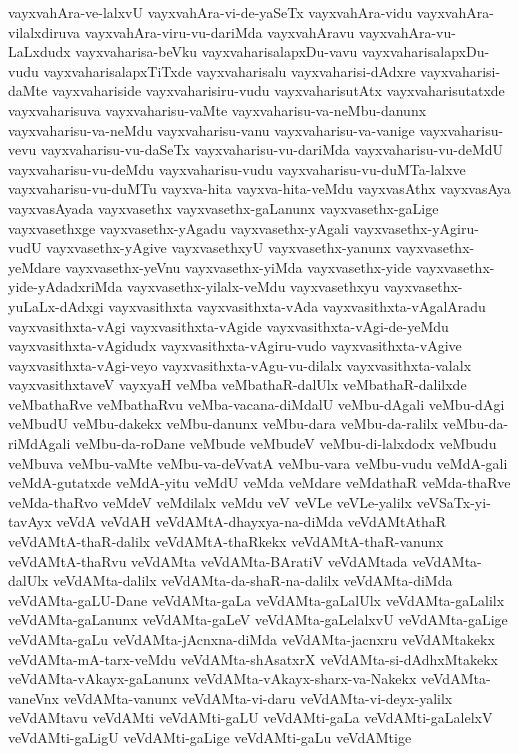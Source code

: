 {vayxvahAra-ve-lalxvU
vayxvahAra-vi-de-yaSeTx
vayxvahAra-vidu
vayxvahAra-vilalxdiruva
vayxvahAra-viru-vu-dariMda
vayxvahAravu
vayxvahAra-vu-LaLxdudx
vayxvaharisa-beVku
vayxvaharisalapxDu-vavu
vayxvaharisalapxDu-vudu
vayxvaharisalapxTiTxde
vayxvaharisalu
vayxvaharisi-dAdxre
vayxvaharisi-daMte
vayxvahariside
vayxvaharisiru-vudu
vayxvaharisutAtx
vayxvaharisutatxde
vayxvaharisuva
vayxvaharisu-vaMte
vayxvaharisu-va-neMbu-danunx
vayxvaharisu-va-neMdu
vayxvaharisu-vanu
vayxvaharisu-va-vanige
vayxvaharisu-vevu
vayxvaharisu-vu-daSeTx
vayxvaharisu-vu-dariMda
vayxvaharisu-vu-deMdU
vayxvaharisu-vu-deMdu
vayxvaharisu-vudu
vayxvaharisu-vu-duMTa-lalxve
vayxvaharisu-vu-duMTu
vayxva-hita
vayxva-hita-veMdu
vayxvasAthx
vayxvasAya
vayxvasAyada
vayxvasethx
vayxvasethx-gaLanunx
vayxvasethx-gaLige
vayxvasethxge
vayxvasethx-yAgadu
vayxvasethx-yAgali
vayxvasethx-yAgiru-vudU
vayxvasethx-yAgive
vayxvasethxyU
vayxvasethx-yanunx
vayxvasethx-yeMdare
vayxvasethx-yeVnu
vayxvasethx-yiMda
vayxvasethx-yide
vayxvasethx-yide-yAdadxriMda
vayxvasethx-yilalx-veMdu
vayxvasethxyu
vayxvasethx-yuLaLx-dAdxgi
vayxvasithxta
vayxvasithxta-vAda
vayxvasithxta-vAgalAradu
vayxvasithxta-vAgi
vayxvasithxta-vAgide
vayxvasithxta-vAgi-de-yeMdu
vayxvasithxta-vAgidudx
vayxvasithxta-vAgiru-vudo
vayxvasithxta-vAgive
vayxvasithxta-vAgi-veyo
vayxvasithxta-vAgu-vu-dilalx
vayxvasithxta-valalx
vayxvasithxtaveV
vayxyaH
veMba
veMbathaR-dalUlx
veMbathaR-dalilxde
veMbathaRve
veMbathaRvu
veMba-vacana-diMdalU
veMbu-dAgali
veMbu-dAgi
veMbudU
veMbu-dakekx
veMbu-danunx
veMbu-dara
veMbu-da-ralilx
veMbu-da-riMdAgali
veMbu-da-roDane
veMbude
veMbudeV
veMbu-di-lalxdodx
veMbudu
veMbuva
veMbu-vaMte
veMbu-va-deVvatA
veMbu-vara
veMbu-vudu
veMdA-gali
veMdA-gutatxde
veMdA-yitu
veMdU
veMda
veMdare
veMdathaR
veMda-thaRve
veMda-thaRvo
veMdeV
veMdilalx
veMdu
veV
veVLe
veVLe-yalilx
veVSaTx-yi-tavAyx
veVdA
veVdAH
veVdAMtA-dhayxya-na-diMda
veVdAMtAthaR
veVdAMtA-thaR-dalilx
veVdAMtA-thaRkekx
veVdAMtA-thaR-vanunx
veVdAMtA-thaRvu
veVdAMta
veVdAMta-BAratiV
veVdAMtada
veVdAMta-dalUlx
veVdAMta-dalilx
veVdAMta-da-shaR-na-dalilx
veVdAMta-diMda
veVdAMta-gaLU-Dane
veVdAMta-gaLa
veVdAMta-gaLalUlx
veVdAMta-gaLalilx
veVdAMta-gaLanunx
veVdAMta-gaLeV
veVdAMta-gaLelalxvU
veVdAMta-gaLige
veVdAMta-gaLu
veVdAMta-jAcnxna-diMda
veVdAMta-jacnxru
veVdAMtakekx
veVdAMta-mA-tarx-veMdu
veVdAMta-shAsatxrX
veVdAMta-si-dAdhxMtakekx
veVdAMta-vAkayx-gaLanunx
veVdAMta-vAkayx-sharx-va-Nakekx
veVdAMta-vaneVnx
veVdAMta-vanunx
veVdAMta-vi-daru
veVdAMta-vi-deyx-yalilx
veVdAMtavu
veVdAMti
veVdAMti-gaLU
veVdAMti-gaLa
veVdAMti-gaLalelxV
veVdAMti-gaLigU
veVdAMti-gaLige
veVdAMti-gaLu
veVdAMtige
}
